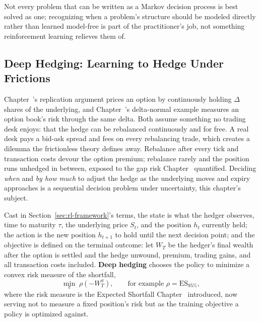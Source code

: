 \documentclass[../ai_in_finance]{subfiles}
\begin{document}
Not every problem that can be written as a Markov decision process is best solved as one; recognizing when a problem's structure should be modeled directly rather than learned model-free is part of the practitioner's job, not something reinforcement learning relieves them of.

\subsection{Deep Hedging: Learning to Hedge Under Frictions}
\label{sec:deep-hedging}

Chapter~'s replication argument prices an option by continuously holding $\Delta$ shares of the underlying, and Chapter~'s delta-normal example measures an option book's risk through the same delta. Both assume something no trading desk enjoys: that the hedge can be rebalanced continuously and for free. A real desk pays a bid-ask spread and fees on every rebalancing trade, which creates a dilemma the frictionless theory defines away. Rebalance after every tick and transaction costs devour the option premium; rebalance rarely and the position runs unhedged in between, exposed to the gap risk Chapter~ quantified. Deciding \emph{when} and \emph{by how much} to adjust the hedge as the underlying moves and expiry approaches is a sequential decision problem under uncertainty, this chapter's subject.

Cast in Section~\ref{sec:rl-framework}'s terms, the state is what the hedger observes, time to maturity $\tau$, the underlying price $S_t$, and the position $h_t$ currently held; the action is the new position $h_{t+1}$ to hold until the next decision point; and the objective is defined on the terminal outcome: let $W_T$ be the hedger's final wealth after the option is settled and the hedge unwound, premium, trading gains, and all transaction costs included. \textbf{Deep hedging} chooses the policy to minimize a convex risk measure of the shortfall,
\begin{equation}
\min_{\pi}\; \rho\!\left(-W_T^{\pi}\right), \qquad \text{for example } \rho = \mathrm{ES}_{95\%},
\label{eq:rl-deep-hedging}
\end{equation}
where the risk measure is the Expected Shortfall Chapter~ introduced, now serving not to measure a fixed position's risk but as the training objective a policy is optimized against.
\end{document}
